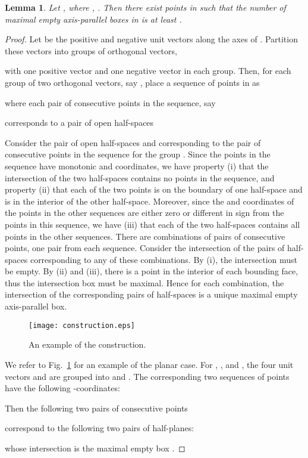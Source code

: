 \documentclass[11pt]{article}
\newtheorem{lemma}{Lemma}
\newcommand{\old}[1]{{}}
\begin{document}
\begin{lemma}\label{lem:construction}
Let , where , .
Then there exist  points in 
such that the number of maximal empty axis-parallel boxes in 
is at least .
\end{lemma}
\begin{proof}
Let 
be the positive and negative unit vectors along the  axes of .
Partition these  vectors into  groups of orthogonal vectors,

with one positive vector and one negative vector in each group.
Then, for each group of two orthogonal vectors, say ,
place a sequence of  points in  as

where each pair of consecutive points in the sequence,
say

corresponds to a pair of open half-spaces

\old{
The intersection of the two half-spaces
contains all points in the other sequences but no points in this sequence,
and is bounded by the two points
in the two directions  and .
There are  combinations of
 pairs of consecutive points,
one pair from each sequence.
For each combination,
the intersection of the corresponding  pairs of half-spaces
is a unique maximal empty axis-parallel box.
}

Consider the pair of open half-spaces  and 
corresponding to the pair of consecutive points in the sequence for
the group .
Since the points in the sequence have monotonic  and  coordinates,
we have property (i) that
the intersection of the two half-spaces contains no points in the sequence,
and property (ii) that
each of the two points is on the boundary of one half-space
and is in the interior of the other half-space.
Moreover,
since the  and  coordinates of the points in the other sequences
are either zero or different in sign from the points in this sequence,
we have (iii) that
each of the two half-spaces contains all points in the other sequences.
There are  combinations of  pairs of consecutive
points, one pair from each sequence.
Consider the intersection  of the  pairs of half-spaces
corresponding to any of these combinations.
By (i), the intersection  must be empty.
By (ii) and (iii),
there is a point in the interior of each bounding face,
thus the intersection box  must be maximal.
Hence for each combination,
the intersection of the corresponding  pairs of half-spaces
is a unique maximal empty axis-parallel box.
\begin{figure}[htb]
\centering\texttt{[image: construction.eps]}
\caption{An example of the construction.}
\label{fig:construction}
\end{figure}

We refer to Fig.~\ref{fig:construction} for an example of the planar case.
For , , and ,
the four unit vectors  and  are grouped into
 and .
The corresponding two sequences of points have the following
-coordinates:  

Then the following two pairs of consecutive points

correspond to the following two pairs of half-planes:

whose intersection is the maximal empty box .
\end{proof}
\end{document}
